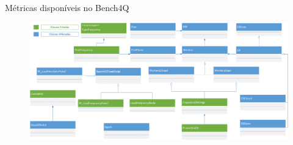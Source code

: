 \begin{frame}{Métricas disponíveis no Bench4Q}
	\begin{figure}[htb]
		\centering
		\includegraphics[scale=0.3]{../monograph/images/diagrama-classes-beanch4Q.png}	
	\end{figure}
\end{frame}